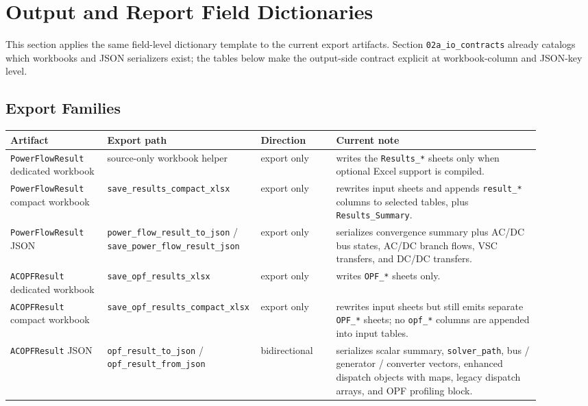 \section{Output and Report Field Dictionaries}
\label{sec:output_field_dictionaries}

This section applies the same field-level dictionary template to the current
export artifacts.  Section \texttt{02a\_io\_contracts} already catalogs which
workbooks and JSON serializers exist; the tables below make the output-side
contract explicit at workbook-column and JSON-key level.

\subsection{Export Families}

\begin{longtable}{@{}L{0.18\linewidth}L{0.20\linewidth}L{0.14\linewidth}L{0.38\linewidth}@{}}
\toprule
Artifact & Export path & Direction & Current note \\
\midrule
\endhead
\texttt{PowerFlowResult} dedicated workbook & source-only workbook helper & export only & writes the \texttt{Results\_*} sheets only when optional Excel support is compiled. \\
\texttt{PowerFlowResult} compact workbook & \texttt{save\_results\_compact\_xlsx} & export only & rewrites input sheets and appends \texttt{result\_*} columns to selected tables, plus \texttt{Results\_Summary}. \\
\texttt{PowerFlowResult} JSON & \texttt{power\_flow\_result\_to\_json} / \texttt{save\_power\_flow\_result\_json} & export only & serializes convergence summary plus AC/DC bus states, AC/DC branch flows, VSC transfers, and DC/DC transfers. \\
\texttt{ACOPFResult} dedicated workbook & \texttt{save\_opf\_results\_xlsx} & export only & writes \texttt{OPF\_*} sheets only. \\
\texttt{ACOPFResult} compact workbook & \texttt{save\_opf\_results\_compact\_xlsx} & export only & rewrites input sheets but still emits separate \texttt{OPF\_*} sheets; no \texttt{opf\_*} columns are appended into input tables. \\
\texttt{ACOPFResult} JSON & \texttt{opf\_result\_to\_json} / \texttt{opf\_result\_from\_json} & bidirectional & serializes scalar summary, \texttt{solver\_path}, bus / generator / converter vectors, enhanced dispatch objects with maps, legacy dispatch arrays, and OPF profiling block. \\

\end{longtable}
